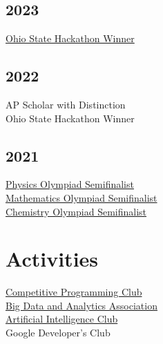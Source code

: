 \documentclass[]{deedy-resume-openfont}
\begin{document}
\begin{minipage}[t]{0.25\textwidth}
\subsection{2023}
\href{https://hack.osu.edu/hs/fall-2023/}{Ohio State Hackathon Winner} \\

\subsection{2022}
{AP Scholar with Distinction} \\
{Ohio State Hackathon Winner} \\
\subsection{2021}
\href{https://www.aapt.org/physicsteam/2024/index.cfm}{Physics Olympiad Semifinalist} \\
\href{https://maa.org/}{Mathematics Olympiad Semifinalist} \\
\href{https://www.acs.org/education/students/highschool/olympiad.html}{Chemistry Olympiad Semifinalist} \\

\section{Activities}
\href{https://cpcosu.github.io/}{Competitive Programming Club} \\
\href{https://bdaaosu.org/}{Big Data and Analytics Association} \\
\href{https://www.osuaiclub.com/}{Artificial Intelligence Club} \\
Google Developer's Club


%
%

\end{minipage} 
\hfill
\end{document}
